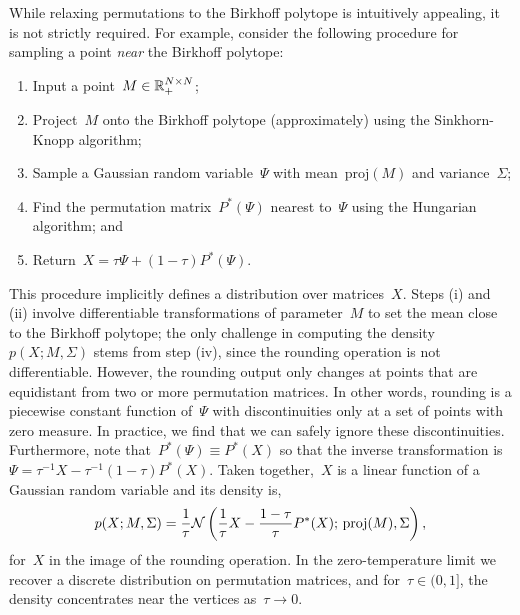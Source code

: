 \documentclass[twoside]{article}
\begin{document}
While relaxing permutations to the Birkhoff polytope is intuitively
appealing, it is not strictly required.  For example, consider the
following procedure for sampling a point \emph{near} the Birkhoff
polytope:
\begin{enumerate}[label=(\roman*)]
\item Input a point~${M \in \mathbb{R}_+^{N \times N}}$;
\item Project~$M$ onto the Birkhoff polytope (approximately) using the Sinkhorn-Knopp algorithm;
\item Sample a Gaussian random variable~$\Psi$ with mean~$\mathrm{proj}(M)$ and variance~$\Sigma$;
\item Find the permutation matrix~${P^*(\Psi)}$ nearest to~$\Psi$ using the Hungarian algorithm;
  and
\item Return~${X = \tau \Psi + (1-\tau) P^*(\Psi)}$.
\end{enumerate}
This procedure implicitly defines a distribution over matrices~$X$.
Steps (i) and (ii) involve differentiable transformations of
parameter~$M$ to set the mean close to the Birkhoff polytope; the only
challenge in computing the density~$p(X; M, \Sigma)$ stems from step
(iv), since the rounding operation is not differentiable.  However,
the rounding output only changes at points that are equidistant from
two or more permutation matrices. In other words, rounding is a
piecewise constant function of~$\Psi$ with discontinuities only at a
set of points with zero measure. In practice, we find that we can
safely ignore these discontinuities.  Furthermore, note
that~${P^*(\Psi) \equiv P^*(X)}$ so that the inverse transformation
is~${\Psi = \tau^{-1}X - \tau^{-1}(1-\tau) P^*(X)}$.  Taken
together,~$X$ is a linear function of a Gaussian random variable and
its density is,
\begin{align*}
  p(X; M, \Sigma) = \frac{1}{\tau} \mathcal{N} \left( \frac{1}{\tau}X -\frac{1-\tau}{\tau} P^*(X); \, \mathrm{proj}(M), \Sigma \right),
\end{align*}
for~$X$ in the image of the rounding operation.  In the
zero-temperature limit we recover a discrete distribution on
permutation matrices, and for~$\tau \in (0,1]$, the density
concentrates near the vertices as~${\tau \to 0}$.
\end{document}
